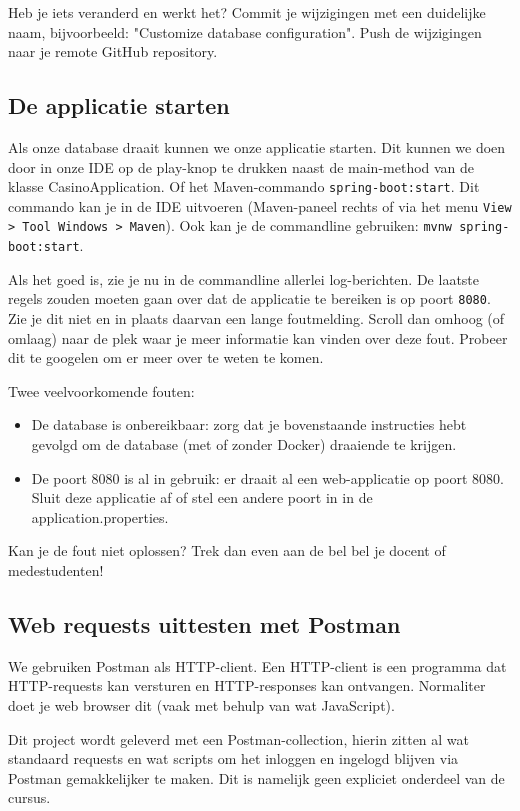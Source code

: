 \documentclass[dutch,a4paper,12pt,doubleside]{book}
\begin{document}
Heb je iets veranderd en werkt het? 
Commit je wijzigingen met een duidelijke naam, 
bijvoorbeeld: "Customize database configuration". 
Push de wijzigingen naar je remote GitHub repository.

\subsection{De applicatie starten}
Als onze database draait kunnen we onze applicatie starten.
Dit kunnen we doen door in onze IDE op de play-knop te drukken naast de main-method 
van de klasse CasinoApplication. Of het Maven-commando \texttt{spring-boot:start}.
Dit commando kan je in de IDE uitvoeren (Maven-paneel rechts of via het menu \texttt{View > Tool Windows > Maven}). 
Ook kan je de commandline gebruiken: \texttt{mvnw spring-boot:start}.

Als het goed is, zie je nu in de commandline allerlei log-berichten. De laatste regels 
zouden moeten gaan over dat de applicatie te bereiken is op poort \texttt{8080}.
Zie je dit niet en in plaats daarvan een lange foutmelding. Scroll dan omhoog (of omlaag)
naar de plek waar je meer informatie kan vinden over deze fout. Probeer dit te googelen 
om er meer over te weten te komen. 

Twee veelvoorkomende fouten:
\begin{itemize}
    \item De database is onbereikbaar: zorg dat je bovenstaande instructies hebt gevolgd om de database (met of zonder Docker)
    draaiende te krijgen.
    \item De poort 8080 is al in gebruik: er draait al een web-applicatie op poort 8080. 
    Sluit deze applicatie af of stel een andere poort in in de application.properties.
\end{itemize}

Kan je de fout niet oplossen? Trek dan even aan de bel bel je docent of medestudenten!

\subsection{Web requests uittesten met Postman}
We gebruiken Postman als HTTP-client. Een HTTP-client is een programma dat 
HTTP-requests kan versturen en HTTP-responses kan ontvangen.
Normaliter doet je web browser dit (vaak met behulp van wat JavaScript).

Dit project wordt geleverd met een Postman-collection,
hierin zitten al wat standaard requests en wat scripts om het inloggen
en ingelogd blijven via Postman gemakkelijker te maken. Dit is namelijk 
geen expliciet onderdeel van de cursus.
\end{document}
